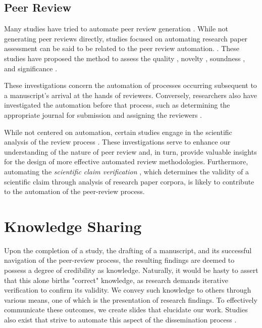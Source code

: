 \documentclass{book}
\begin{document}
\subsection{Peer Review}
Many studies have tried to automate peer review generation \cite{thelwall2019artificial,li2019generating,schulz2022future,yuan2022can,yuan2022kid,lin2021automated1,lin2021automated2,kumar2022investigations,bharti2022can,uban2021generating,wang2020reviewrobot}. While not generating peer reviews directly, studies focused on automating research paper assessment  can be said to be related to the peer review automation. \cite{kousha2022artificial,li2020multi,huang2018deep}. These studies have proposed the method to assess the quality \cite{thelwall2022predicting,thelwall2022can}, novelty \cite{pelletier2022novelpy,amplayo2019evaluating,shibayama2020measuring}, soundness \cite{cabanac2022decontamination}, and significance \cite{zong2022citation,xia2023review,soni2022predicting,manghi2021new,soni2021follow,van2020schubert,mckeown2016predicting}.

These investigations concern the automation of processes occurring subsequent to a manuscript's arrival at the hands of reviewers. Conversely, researchers also have investigated the automation before that process, such as determining the appropriate journal for submission \cite{michail2023journal} and assigning the reviewers \cite{zhao2022reviewer}.

While not centered on automation, certain studies engage in the scientific analysis of the review process \cite{shah2022challenges,verma2021attend,bharti2022confident,bharti2022betterpr,verma2022lack,kennard2022disapere}. These investigations serve to enhance our understanding of the nature of peer review and, in turn, provide valuable insights for the design of more effective automated review methodologies. Furthermore, automating the \textit{scientific claim verification} \cite{li2019scientific,wadden2020fact,wadden2022scifact,wadden2022multivers}, which determines the validity of a scientific claim through analysis of research paper corpora, is likely to contribute to the automation of the peer-review process.

\section{Knowledge Sharing}

Upon the completion of a study, the drafting of a manuscript, and its successful navigation of the peer-review process, the resulting findings are deemed to possess a degree of credibility as knowledge. Naturally, it would be hasty to assert that this alone births "correct" knowledge, as research demands iterative verification to confirm its validity. We convey such knowledge to others through various means, one of which is the presentation of research findings. To effectively communicate these outcomes, we create slides that elucidate our work. Studies also exist that strive to automate this aspect of the dissemination process \cite{sefid2019automatic}.
\end{document}

